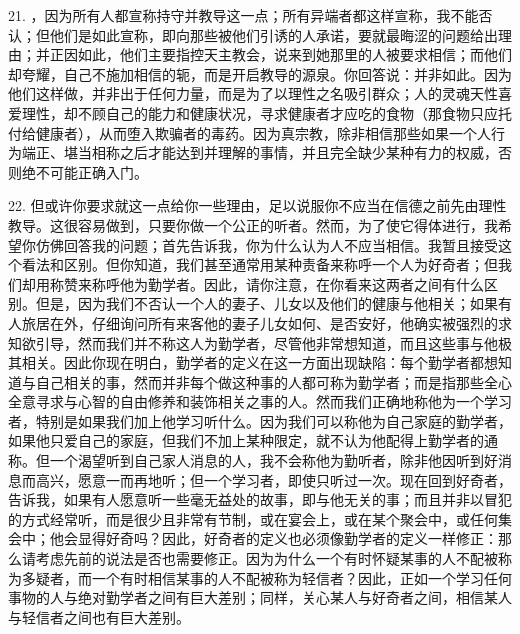 21. ，因为所有人都宣称持守并教导这一点；所有异端者都这样宣称，我不能否认；但他们是如此宣称，即向那些被他们引诱的人承诺，要就最晦涩的问题给出理由；并正因如此，他们主要指控天主教会，说来到她那里的人被要求相信；而他们却夸耀，自己不施加相信的轭，而是开启教导的源泉。你回答说：并非如此。因为他们这样做，并非出于任何力量，而是为了以理性之名吸引群众；人的灵魂天性喜爱理性，却不顾自己的能力和健康状况，寻求健康者才应吃的食物（那食物只应托付给健康者），从而堕入欺骗者的毒药。因为真宗教，除非相信那些如果一个人行为端正、堪当相称之后才能达到并理解的事情，并且完全缺少某种有力的权威，否则绝不可能正确入门。\par

22. 但或许你要求就这一点给你一些理由，足以说服你不应当在信德之前先由理性教导。这很容易做到，只要你做一个公正的听者。然而，为了使它得体进行，我希望你仿佛回答我的问题；首先告诉我，你为什么认为人不应当相信。我暂且接受这个看法和区别。但你知道，我们甚至通常用某种责备来称呼一个人为好奇者；但我们却用称赞来称呼他为勤学者。因此，请你注意，在你看来这两者之间有什么区别。但是，因为我们不否认一个人的妻子、儿女以及他们的健康与他相关；如果有人旅居在外，仔细询问所有来客他的妻子儿女如何、是否安好，他确实被强烈的求知欲引导，然而我们并不称这人为勤学者，尽管他非常想知道，而且这些事与他极其相关。因此你现在明白，勤学者的定义在这一方面出现缺陷：每个勤学者都想知道与自己相关的事，然而并非每个做这种事的人都可称为勤学者；而是指那些全心全意寻求与心智的自由修养和装饰相关之事的人。然而我们正确地称他为一个学习者，特别是如果我们加上他学习听什么。因为我们可以称他为自己家庭的勤学者，如果他只爱自己的家庭，但我们不加上某种限定，就不认为他配得上勤学者的通称。但一个渴望听到自己家人消息的人，我不会称他为勤听者，除非他因听到好消息而高兴，愿意一而再地听；但一个学习者，即使只听过一次。现在回到好奇者，告诉我，如果有人愿意听一些毫无益处的故事，即与他无关的事；而且并非以冒犯的方式经常听，而是很少且非常有节制，或在宴会上，或在某个聚会中，或任何集会中；他会显得好奇吗？因此，好奇者的定义也必须像勤学者的定义一样修正：那么请考虑先前的说法是否也需要修正。因为为什么一个有时怀疑某事的人不配被称为多疑者，而一个有时相信某事的人不配被称为轻信者？因此，正如一个学习任何事物的人与绝对勤学者之间有巨大差别；同样，关心某人与好奇者之间，相信某人与轻信者之间也有巨大差别。\par

